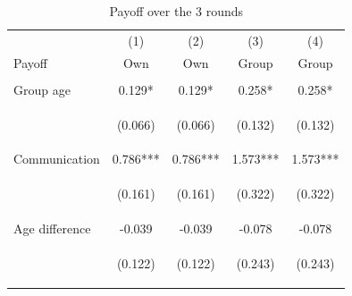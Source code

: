 \documentclass{article} %
\begin{document}
\begin{table}[H]
\caption{Payoff over the 3 rounds} \label{tab:total_results}

\begin{center}
\begin{tabular}{lcccc} \hline
 & (1) & (2) & (3) & (4) \\
Payoff & Own & Own & Group & Group \\ \hline
\vspace{4pt} & \begin{footnotesize}\end{footnotesize} & \begin{footnotesize}\end{footnotesize} & \begin{footnotesize}\end{footnotesize} & \begin{footnotesize}\end{footnotesize} \\
Group age & 0.129* & 0.129* & 0.258* & 0.258* \\
\vspace{4pt} & \begin{footnotesize}(0.066)\end{footnotesize} & \begin{footnotesize}(0.066)\end{footnotesize} & \begin{footnotesize}(0.132)\end{footnotesize} & \begin{footnotesize}(0.132)\end{footnotesize} \\
Communication & 0.786*** & 0.786*** & 1.573*** & 1.573*** \\
\vspace{4pt} & \begin{footnotesize}(0.161)\end{footnotesize} & \begin{footnotesize}(0.161)\end{footnotesize} & \begin{footnotesize}(0.322)\end{footnotesize} & \begin{footnotesize}(0.322)\end{footnotesize} \\
Age difference & -0.039 & -0.039 & -0.078 & -0.078 \\
\vspace{4pt} & \begin{footnotesize}(0.122)\end{footnotesize} & \begin{footnotesize}(0.122)\end{footnotesize} & \begin{footnotesize}(0.243)\end{footnotesize} & \begin{footnotesize}(0.243)\end{footnotesize} \\

\end{tabular}
\end{center}
\end{table}
\end{document}
